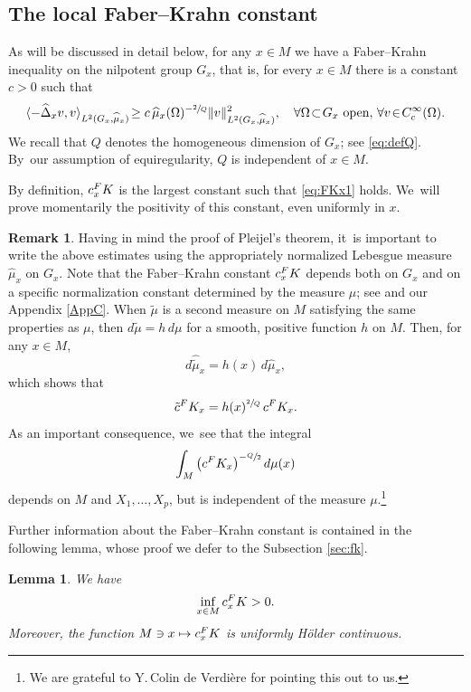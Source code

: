 \documentclass[11pt]{article}
\newcommand\mto{\mathchoice{\longmapsto}{\mapsto}{\mapsto}{\mapsto}}
\let\oldsfrac\sfrac
\renewcommand{\sfrac}[2]{{\oldsfrac{#1}{#2}}}
\newcommand{\rc}{\textup{c}}
\newcommand{\FK}{\textup{FK}}
\newtheorem{lemma}[theorem]{Lemma}
\theoremstyle{definition}
\newtheorem{remark}[theorem]{Remark}
\newcommand{\1}{\mathbbm{1}}
\numberwithin{equation}{section}
\begin{document}
\subsection{The local Faber--Krahn constant}
As will be discussed in detail below, for any $x\in M$ we have a Faber--Krahn inequality on the nilpotent group $G_x$, that is, for every $x\in M$ there is a constant $c>0$ such that
\begin{equation} \label{eq:FKx1}
\langle - \widehat \Delta_x v,v\rangle_{L^2(G_x,\widehat\mu_x)} \!\geq c\,\widehat\mu_x(\Omega)^{-\sfrac 2Q} \| v\|_{L^2(G_x,\widehat\mu_x)}^2,
\quad \forall \Omega\!\subset\! G_x \ \text{open},\,\forall v\!\in\! C_\rc^\infty (\Omega).
\end{equation}
We recall that $Q$ denotes the homogeneous dimension of $G_x$; see \eqref{eq:defQ}. By~our assumption of equiregularity, $Q$ is independent of $x\in M$.

By definition, $c_x^\FK$ is the largest constant such that \eqref{eq:FKx1} holds. We~will prove momentarily the positivity of this constant, even uniformly in $x$.

\begin{remark}\label{rem:fkindepmeas}
Having in mind the proof of Pleijel's theorem, it~is important to write the above estimates using the appropriately normalized Lebesgue measure $\widehat \mu_x$ on $G_x$. Note that the Faber--Krahn constant $c_x^\FK$ depends both on $G_x$ and on a specific normalization constant determined by the measure $\mu$; see \cite[App.\,A.5.6]{CHT1} and our Appendix \ref{AppC}. When $\tilde\mu$ is a second measure on $M$ satisfying the same properties as $\mu$, then $d\tilde\mu = h\,d\mu$ for a smooth, positive function $h$ on $M$. Then, for any $x\in M$,
\[
d\widehat{\tilde\mu}_x = h(x) \,d\widehat\mu_x,
\]
which shows that
\[
\tilde c^\FK_x = h(x)^{\sfrac 2Q} \,c^\FK_x.
\]
As an important consequence, we~see that the integral
\[
\int_M \left(c^\FK_x\right)^{-\sfrac Q2}d\mu(x)
\]
depends on $M$ and $X_1,\ldots, X_p$, but is independent of the measure $\mu$.\footnote{We are grateful to Y.\,Colin de Verdière for pointing this out to us.}
\end{remark}

Further information about the Faber--Krahn constant is contained in the following lemma, whose proof we defer to the Subsection \ref{sec:fk}.

\begin{lemma}\label{faberkrahn}
We have
\begin{equation}\label{eq:fk1}
\inf_{x\in M} c_x^\FK >0.
\end{equation}
Moreover, the function $M\ni x\mto c_x^\FK$ is uniformly Hölder continuous.
\end{lemma}
\end{document}
